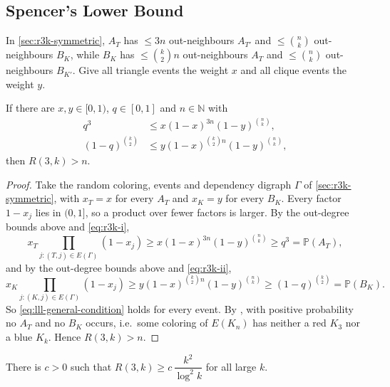 \subsection{Spencer's Lower Bound}\label{sec:r3k-spencer}

In \autoref{sec:r3k-symmetric}, \(A_{T}\) has \(\le 3n\) out-neighbours \(A_{T'}\) and \(\le \binom{n}{k}\) out-neighbours \(B_{K}\), while \(B_{K}\) has \(\le \binom{k}{2} n\) out-neighbours \(A_{T}\) and \(\le \binom{n}{k}\) out-neighbours \(B_{K'}\). Give all triangle events the weight \(x\) and all clique events the weight \(y\).

\begin{theorem}[Spencer, 1977]\label{thm:r3k-lll}
    If there are \(x, y \in [0,1)\), \(q \in [0,1]\) and \(n \in \mathbb{N}\) with
    \begin{align}
        q^{3} &\le x (1-x)^{3n} (1-y)^{\binom{n}{k}}, \label{eq:r3k-i} \\
        (1-q)^{\binom{k}{2}} &\le y (1-x)^{\binom{k}{2} n} (1-y)^{\binom{n}{k}}, \label{eq:r3k-ii}
    \end{align}
    then \(R(3,k) > n\).
\end{theorem}

\begin{proof}
    Take the random coloring, events and dependency digraph \(\Gamma\) of \autoref{sec:r3k-symmetric}, with \(x_{T} = x\) for every \(A_{T}\) and \(x_{K} = y\) for every \(B_{K}\). Every factor \(1 - x_{j}\) lies in \((0,1]\), so a product over fewer factors is larger. By the out-degree bounds above and \eqref{eq:r3k-i},
    \[
        x_{T} \prod_{j : (T,j) \in E(\Gamma)} (1 - x_{j}) \ge x (1-x)^{3n} (1-y)^{\binom{n}{k}} \ge q^{3} = \mathbb{P}(A_{T}),
    \]
    and by the out-degree bounds above and \eqref{eq:r3k-ii},
    \[
        x_{K} \prod_{j : (K,j) \in E(\Gamma)} (1 - x_{j}) \ge y (1-x)^{\binom{k}{2} n} (1-y)^{\binom{n}{k}} \ge (1-q)^{\binom{k}{2}} = \mathbb{P}(B_{K}) .
    \]
    So \eqref{eq:lll-general-condition} holds for every event. By , with positive probability no \(A_{T}\) and no \(B_{K}\) occurs, i.e.\ some coloring of \(E(K_{n})\) has neither a red \(K_{3}\) nor a blue \(K_{k}\). Hence \(R(3,k) > n\).
\end{proof}

\begin{corollary}\label{cor:r3k-lll}
    There is \(c > 0\) such that \(R(3,k) \ge c \, \dfrac{k^{2}}{\log^{2} k}\) for all large \(k\).
\end{corollary}

